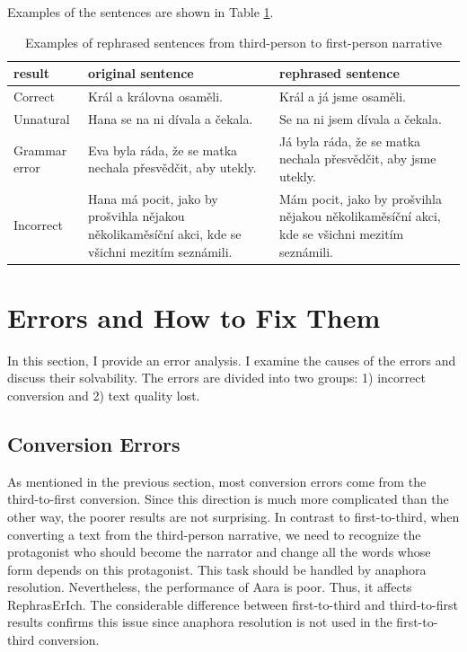 Examples of the sentences are shown in Table \ref{tab:example-third}.

\begin{table}[!ht]
	\caption{Examples of rephrased sentences from third-person to first-person narrative}
	\label{tab:example-third}
	\begin{flushleft}
		\begin{tabular}{m{5em}|m{11em}|m{11em}}
			result & original sentence & rephrased sentence \\
			\hline
			Correct & Král a královna osaměli. & Král a já jsme osaměli. \\
			Unnatural & Hana se na ni dívala a čekala. & Se na ni jsem dívala a čekala. \\
			Grammar error & Eva byla ráda, že se matka nechala přesvědčit, aby utekly. & Já byla ráda, že se matka nechala přesvědčit, aby jsme utekly. \\
			Incorrect & Hana má pocit, jako by prošvihla nějakou několikaměsíční akci, kde se všichni mezitím seznámili. & Mám pocit, jako by prošvihla nějakou několikaměsíční akci, kde se všichni mezitím seznámili.\\
		\end{tabular}
	\end{flushleft}
\end{table}


\section{Errors and How to Fix Them} \label{sec:errors}

In this section, I provide an error analysis. I examine the causes of the errors and discuss their solvability. The errors are divided into two groups: 1) incorrect conversion and 2) text quality lost.

\subsection{Conversion Errors}

As mentioned in the previous section, most conversion errors come from the third-to-first conversion. Since this direction is much more complicated than the other way, the poorer results are not surprising. In contrast to first-to-third, when converting a text from the third-person narrative, we need to recognize the protagonist who should become the narrator and change all the words whose form depends on this protagonist. This task should be handled by anaphora resolution. Nevertheless, the performance of Aara is poor. Thus, it affects RephrasErIch. The considerable difference between first-to-third and third-to-first results confirms this issue since anaphora resolution is not used in the first-to-third conversion.

